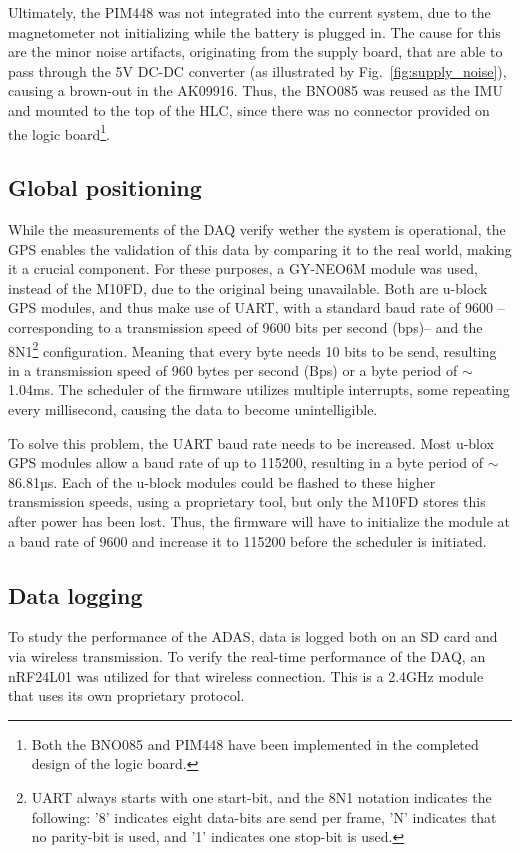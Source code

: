 \documentclass[conference,a4paper]{IEEEtran}
\let\oldsubsection\subsection
\renewcommand{\subsection}[1]{
  \setlength{\parskip}{0.5em}
  \setlength{\parindent}{0pt}
  \oldsubsection{#1}
}
\newcommand{\ParagraphSeperator}{
  \setlength{\parskip}{0em}
  \setlength{\parindent}{10pt}
}
\begin{document}
\ParagraphSeperator
Ultimately, the PIM448 was not integrated into the current system, due to the magnetometer not initializing while the battery is plugged in.
The cause for this are the minor noise artifacts, originating from the supply board, that are able to pass through the 5V DC-DC converter (as illustrated by Fig.~\ref{fig:supply_noise}), causing a brown-out in the AK09916.
Thus, the BNO085 was reused as the IMU and mounted to the top of the HLC, since there was no connector provided on the logic board\footnote{Both the BNO085 and PIM448 have been implemented in the completed design of the logic board.}.

\subsection{Global positioning}
\ParagraphSeperator
While the measurements of the DAQ verify wether the system is operational, the GPS enables the validation of this data by comparing it to the real world, making it a crucial component.
For these purposes, a GY-NEO6M module was used, instead of the M10FD, due to the original being unavailable.
Both are u-block GPS modules, and thus make use of UART, with a standard baud rate of 9600 --corresponding to a transmission speed of 9600 bits per second (bps)-- and the 8N1\footnote{UART always starts with one start-bit, and the 8N1 notation indicates the following: '8' indicates eight data-bits are send per frame, 'N' indicates that no parity-bit is used, and '1' indicates one stop-bit is used.} configuration.
Meaning that every byte needs 10 bits to be send, resulting in a transmission speed of 960 bytes per second (Bps) or a byte period of $\sim$1.04ms.
The scheduler of the firmware utilizes multiple interrupts, some repeating every millisecond, causing the data to become unintelligible.

\ParagraphSeperator
To solve this problem, the UART baud rate needs to be increased.
Most u-blox GPS modules allow a baud rate of up to 115200, resulting in a byte period of $\sim$86.81µs.
Each of the u-block modules could be flashed to these higher transmission speeds, using a proprietary tool, but only the M10FD stores this after power has been lost.
Thus, the firmware will have to initialize the module at a baud rate of 9600 and increase it to 115200 before the scheduler is initiated.

\subsection{Data logging}
\ParagraphSeperator
To study the performance of the ADAS, data is logged both on an SD card and via wireless transmission.
To verify the real-time performance of the DAQ, an nRF24L01 was utilized for that wireless connection.
This is a 2.4GHz module that uses its own proprietary protocol.
\end{document}
